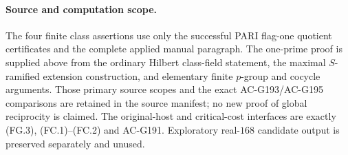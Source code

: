 \paragraph{Source and computation scope.}
The four finite class assertions use only the successful
PARI flag-one quotient certificates and the complete applied
manual paragraph. The one-prime proof is supplied above from
the ordinary Hilbert class-field statement, the maximal
$S$-ramified extension construction, and elementary finite
$p$-group and cocycle arguments. Those primary source scopes
and the exact AC-G193/AC-G195 comparisons are retained in the
source manifest; no new proof of global reciprocity is claimed.
The original-host and critical-cost interfaces are exactly
(FG.3), (FC.1)--(FC.2) and AC-G191. Exploratory real-$168$
candidate output is preserved separately and unused.
